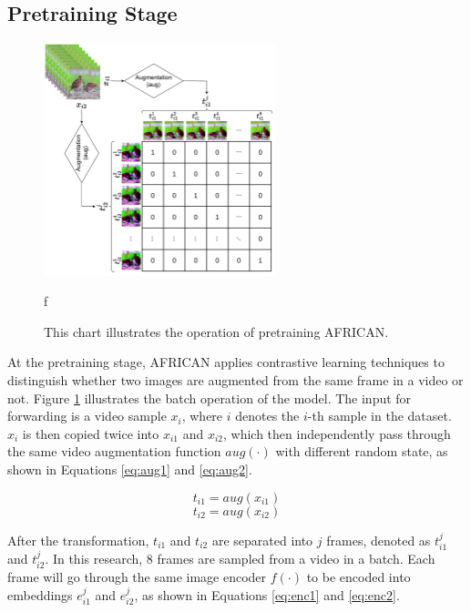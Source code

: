 \subsection{Pretraining Stage}

\begin{figure}[ht]
    \centering
    \includegraphics[width=0.6\textwidth]{assets/charts/3_3_ConstrastiveSimilarityMatrix}
    \caption[Operation of pretraining AFRICAN]{This chart illustrates the operation of pretraining AFRICAN.}
f\label{fig:modelstructafsim}
\end{figure}

At the pretraining stage, AFRICAN applies contrastive learning techniques to distinguish whether two images are augmented from the same frame in a video or not. Figure \ref{fig:modelstructafsim} illustrates the batch operation of the model. The input for forwarding is a video sample $x_i$, where $i$ denotes the $i$-th sample in the dataset. $x_i$ is then copied twice into $x_{i1}$ and $x_{i2}$, which then independently pass through the same video augmentation function $aug(\cdot)$ with different random state, as shown in Equations \ref{eq:aug1} and \ref{eq:aug2}. 

\begin{equation}
    \label{eq:aug1}
    t_{i1} = aug(x_{i1})
\end{equation}
\begin{equation}
    \label{eq:aug2}
    t_{i2} = aug(x_{i2})
\end{equation}

After the transformation, $t_{i1}$ and $t_{i2}$ are separated into $j$ frames, denoted as $t_{i1}^j$ and $t_{i2}^j$. In this research, 8 frames are sampled from a video in a batch. Each frame will go through the same image encoder $f(\cdot)$ to be encoded into embeddings $e_{i1}^j$ and $e_{i2}^j$, as shown in Equations \ref{eq:enc1} and \ref{eq:enc2}.

